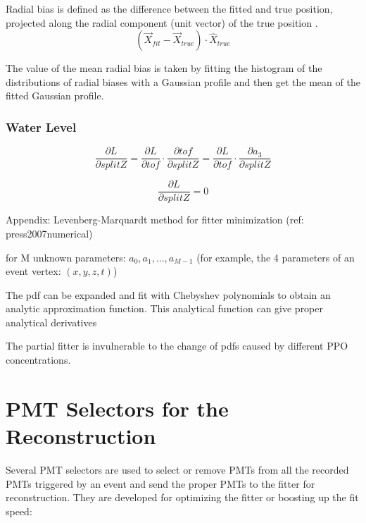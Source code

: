 Radial bias is defined as the difference between the fitted and true position, projected along the radial component (unit vector) of the true position \cite{coulter2013modelling}.
\[
(\vec{X}_{fit}-\vec{X}_{true})\cdot \hat{X}_{true}
\]


The value of the mean radial bias is taken by fitting the histogram of the distributions of radial biases with a Gaussian profile and then get the mean of the fitted Gaussian profile.



\subsubsection{Water Level}

\[
\frac{\partial L}{\partial splitZ} = \frac{\partial L}{\partial tof}\cdot\frac{\partial tof}{\partial splitZ}=\frac{\partial L}{\partial tof}\cdot\frac{\partial a_3}{\partial splitZ}
\]


\[
\frac{\partial L}{\partial splitZ} = 0
\]


Appendix: Levenberg-Marquardt method for fitter minimization
(ref: press2007numerical)

for M unknown parameters: $a_0, a_1, ... , a_{M-1}$ (for example, the 4 parameters of an event vertex: $(x,y,z,t)$)



The pdf can be expanded and fit with Chebyshev polynomials to obtain an analytic approximation function\cite{press2007numerical}. This analytical function can give proper analytical derivatives

The partial fitter is invulnerable to the change of pdfs caused by different PPO concentrations.


\section{PMT Selectors for the Reconstruction}\label{sect:PMTselector}
Several PMT selectors are used to select or remove PMTs from all the recorded PMTs triggered by an event and send the proper PMTs to the fitter for reconstruction. They are developed for optimizing the fitter or boosting up the fit speed:

